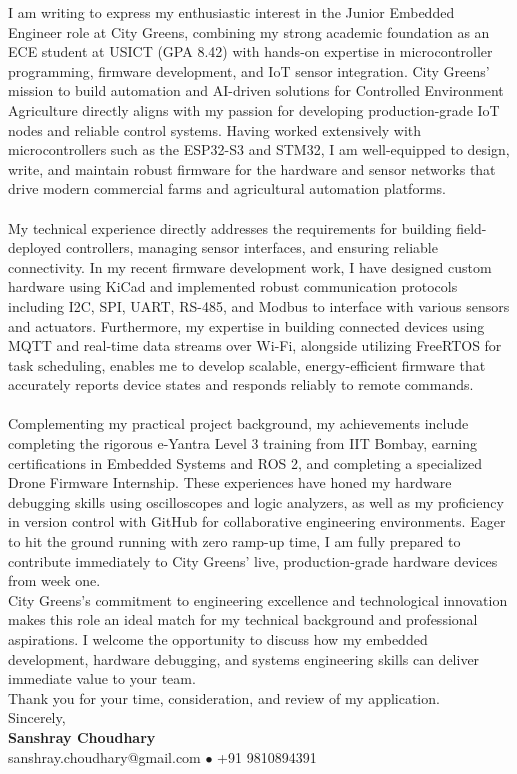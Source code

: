 \documentclass[10pt,a4paper]{article}%
\begin{document}
\noindent I am writing to express my enthusiastic interest in the Junior Embedded Engineer role at City Greens, combining my strong academic foundation as an ECE student at USICT (GPA 8.42) with hands-on expertise in microcontroller programming, firmware development, and IoT sensor integration. City Greens' mission to build automation and AI-driven solutions for Controlled Environment Agriculture directly aligns with my passion for developing production-grade IoT nodes and reliable control systems. Having worked extensively with microcontrollers such as the ESP32-S3 and STM32, I am well-equipped to design, write, and maintain robust firmware for the hardware and sensor networks that drive modern commercial farms and agricultural automation platforms.\\
\vspace{8pt}\\
My technical experience directly addresses the requirements for building field-deployed controllers, managing sensor interfaces, and ensuring reliable connectivity. In my recent firmware development work, I have designed custom hardware using KiCad and implemented robust communication protocols including I2C, SPI, UART, RS-485, and Modbus to interface with various sensors and actuators. Furthermore, my expertise in building connected devices using MQTT and real-time data streams over Wi-Fi, alongside utilizing FreeRTOS for task scheduling, enables me to develop scalable, energy-efficient firmware that accurately reports device states and responds reliably to remote commands.\\
\vspace{8pt}\\
Complementing my practical project background, my achievements include completing the rigorous e-Yantra Level 3 training from IIT Bombay, earning certifications in Embedded Systems and ROS 2, and completing a specialized Drone Firmware Internship. These experiences have honed my hardware debugging skills using oscilloscopes and logic analyzers, as well as my proficiency in version control with GitHub for collaborative engineering environments. Eager to hit the ground running with zero ramp-up time, I am fully prepared to contribute immediately to City Greens' live, production-grade hardware devices from week one. \vspace{8pt}\\

\noindent City Greens's commitment to engineering excellence and technological innovation makes this role an ideal match for my technical background and professional aspirations. I welcome the opportunity to discuss how my embedded development, hardware debugging, and systems engineering skills can deliver immediate value to your team. \vspace{8pt}\\%

\noindent Thank you for your time, consideration, and review of my application. \vspace{18pt}\\%

\noindent Sincerely, \vspace{8pt}\\%
\textbf{Sanshray Choudhary} \\%
sanshray.choudhary@gmail.com $\bullet$ +91 9810894391 \\%
\end{document}
